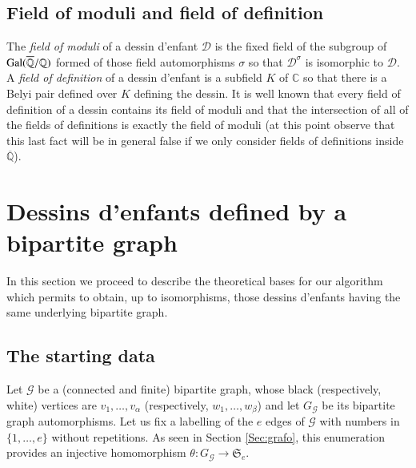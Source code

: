 \documentclass[12pt]{amsart}
\theoremstyle{remark}
\begin{document}
\subsection{Field of moduli and field of definition}
The {\it field of moduli} of a dessin d'enfant ${\mathcal D}$ is the fixed field of the subgroup of ${\rm Gal}(\overline{\mathbb Q}/{\mathbb Q})$ formed of those field automorphisms $\sigma$ so that ${\mathcal D}^{\sigma}$ is isomorphic to ${\mathcal D}$. A {\it field of definition} of a dessin d'enfant is a subfield $K$ of ${\mathbb C}$ so that there is a Belyi pair defined over $K$ defining the dessin. 
It is well known that every field of definition of a dessin contains its field of moduli and that the intersection of all of the fields of definitions is exactly the field of moduli \cite{Koizumi} (at this point observe that this last fact will be in general false if we only consider fields of definitions inside $\overline{\mathbb Q}$).

\section{Dessins d'enfants defined by a bipartite graph}\label{Sec:mainpart}
In this section we proceed to describe the theoretical bases for our algorithm which permits to obtain, up to isomorphisms, those dessins d'enfants having the same underlying bipartite graph.

{\vspace{0.3cm}}
\subsection{The starting data}
Let ${\mathcal G}$ be a (connected and finite) bipartite graph, whose black (respectively, white) vertices are $v_{1},\ldots,v_{\alpha}$ (respectively, $w_{1},\ldots,w_{\beta}$) and let $G_{\mathcal G}$ be its bipartite graph automorphisms. Let us fix a labelling of the $e$ edges of ${\mathcal G}$ with numbers in $\{1,\ldots,e\}$ without repetitions. As seen in Section \ref{Sec:grafo}, this enumeration provides an injective homomorphism $\theta:G_{\mathcal G} \to {\mathfrak S}_{e}$.
\end{document}
